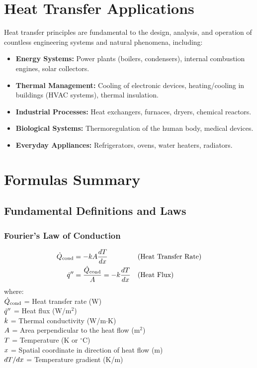 \section{Heat Transfer Applications}

Heat transfer principles are fundamental to the design, analysis, and operation of countless engineering systems and natural phenomena, including:
\begin{itemize}
    \item \textbf{Energy Systems:} Power plants (boilers, condensers), internal combustion engines, solar collectors.
    \item \textbf{Thermal Management:} Cooling of electronic devices, heating/cooling in buildings (HVAC systems), thermal insulation.
    \item \textbf{Industrial Processes:} Heat exchangers, furnaces, dryers, chemical reactors.
    \item \textbf{Biological Systems:} Thermoregulation of the human body, medical devices.
    \item \textbf{Everyday Appliances:} Refrigerators, ovens, water heaters, radiators.
\end{itemize}

\section{Formulas Summary}

\subsection{Fundamental Definitions and Laws}
\subsubsection*{Fourier's Law of Conduction}
\begin{align}
\label{eq:fourier_qdot_formula}
    \dot{Q}_{\text{cond}} &= -k A \frac{dT}{dx} && \text{(Heat Transfer Rate)} \\
    \dot{q}'' &= \frac{\dot{Q}_{\text{cond}}}{A} = -k \frac{dT}{dx} && \text{(Heat Flux)}
\end{align}
where: \\
$\dot{Q}_{\text{cond}}$ = Heat transfer rate (W) \\
$\dot{q}''$ = Heat flux (W/m$^2$) \\
$k$ = Thermal conductivity (W/m$\cdot$K) \\
$A$ = Area perpendicular to the heat flow (m$^2$) \\
$T$ = Temperature (K or $^\circ$C) \\
$x$ = Spatial coordinate in direction of heat flow (m) \\
$dT/dx$ = Temperature gradient (K/m)

